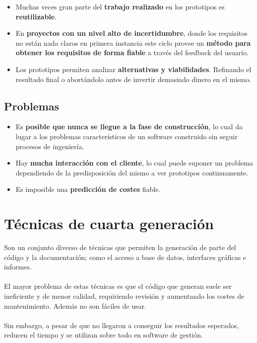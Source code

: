 \begin{itemize}
    \item Muchas veces gran parte del \textbf{trabajo realizado} en los prototipos es \textbf{reutilizable}.
    \item En \textbf{proyectos con un nivel alto de incertidumbre}, donde los requisitos no están nada claros en primera instancia este ciclo provee un \textbf{método para obtener los requisitos de forma fiable} a través del feedback del usuario.
    \item Los prototipos permiten analizar \textbf{alternativas y viabilidades}. Refinando el resultado final o abortándolo antes de invertir demasiado dinero en el mismo.
\end{itemize}

\subsection{Problemas}
\begin{itemize}
   \item Es \textbf{posible que nunca se llegue a la fase de construcción}, lo cual da lugar a los problemas característicos de un software construido sin seguir procesos de ingeniería.
   \item Hay \textbf{mucha interacción con el cliente}, lo cual puede suponer un problema dependiendo de la predisposición del mismo a ver prototipos continuamente.
   \item Es imposible una \textbf{predicción de costes} fiable.
\end{itemize}



\section{Técnicas de cuarta generación}
Son un conjunto diverso de técnicas que permiten la generación de parte del código y la documentación; como el acceso a base de datos, interfaces gráficas e informes.\\\\
El mayor problema de estas técnicas es que el código que generan suele ser ineficiente y de menor calidad, requiriendo revisión y aumentando los costes de mantenimiento. Además no son fáciles de usar.\\\\ 
Sin embargo, a pesar de que no llegaron a conseguir los resultados esperados, reducen el tiempo y se utilizan sobre todo en software de gestión.


